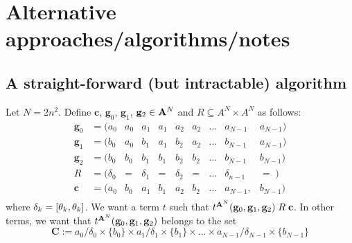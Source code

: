   \newpage
  \appendix

    \section{Alternative approaches/algorithms/notes}
    \subsection{A straight-forward (but intractable) algorithm}
    Let $N = 2n^2$.  Define $\mathbf{c}$, $\mathbf{g}_0$, $\mathbf{g}_1$, $\mathbf{g}_2 \in \mathbf{A}^{N}$
    and $R \subseteq A^{N}\times A^{N}$ as follows:
    \begin{equation}
    \begin{array}{cccccccccc}
      \mathbf{g}_0 &= (a_0 & a_0 &a_1 &a_1 &a_2 &a_2 & \dots & a_{N-1} & a_{N-1}) \\
      \mathbf{g}_1 &= (b_0 & a_0 &b_1 &a_1 &b_2 &a_2 & \dots & b_{N-1} & a_{N-1}) \\
      \mathbf{g}_2 &= (b_0 & b_0 &b_1 &b_1 &b_2 &b_2 & \dots & b_{N-1} & b_{N-1})\\[4pt]
        R  & = (\delta_0 & =  & \delta_1 & = & \delta_2 & = & \dots  & \delta_{n-1} & = \; )\\ [4pt]
      \mathbf{c}            & = (a_0     & b_0       & a_1      & b_1      & a_2      & b_2      & \dots  & a_{N-1}, & b_{N-1}) \\
    \end{array}
    \end{equation}
    where $\delta_k= [\theta_k, \theta_k]$.  We want a term $t$ such that $t^{\mathbf{A}^{N}}(\mathbf{g}_0, \mathbf{g}_1, \mathbf{g}_2)\mathrel{R} \mathbf{c}$.
    In other terms, we want that $t^{\mathbf{A}^{N}}(\mathbf{g}_0, \mathbf{g}_1, \mathbf{g}_2)$ belongs to the set
    \[
    \mathbf{C} := a_0/\delta_0 \times \{b_0\} \times a_1/\delta_1 \times \{b_1\} \times   \dots \times a_{N-1}/\delta_{N-1} \times \{b_{N-1}\}
    \]

